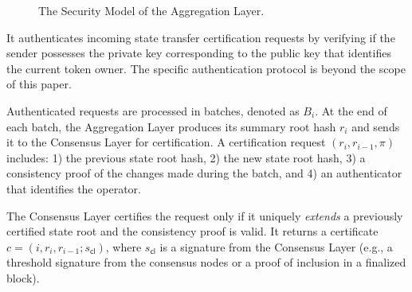 \documentclass[twocolumn]{article}
\begin{document}
\begin{figure}[!htbp]
    \centering
{}
    \caption{The Security Model of the Aggregation Layer.}\label{fig:model}
\end{figure}

It authenticates incoming state transfer certification requests by verifying if the sender possesses the private key corresponding to the public key that identifies the current token owner. The specific authentication protocol is beyond the scope of this paper.

Authenticated requests are processed in batches, denoted as $B_i$. At the end of each batch, the Aggregation Layer produces its summary root hash $r_i$ and sends it to the Consensus Layer for certification. A certification request $(r_i, r_{i-1}, \pi)$ includes: 1) the previous state root hash, 2) the new state root hash, 3) a consistency proof of the changes made during the batch, and 4) an authenticator that identifies the operator.

The Consensus Layer certifies the request only if it uniquely \textit{extends} a previously certified state root and the consistency proof is valid. It returns a certificate $c = (i, r_i, r_{i-1}; s_{\textsf{cl}})$, where $s_{\textsf{cl}}$ is a signature from the Consensus Layer (e.g., a threshold signature from the consensus nodes or a proof of inclusion in a finalized block).
\end{document}
